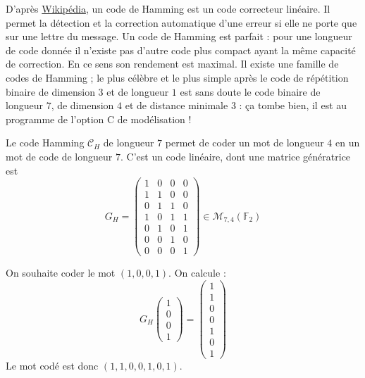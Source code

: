 	D'après \href{https://fr.wikipedia.org/wiki/Code_de_Hamming}{Wikipédia}, un code de Hamming est un code correcteur linéaire. Il permet la détection et la correction automatique d'une erreur si elle ne porte que sur une lettre du message. Un code de Hamming est parfait : pour une longueur de code donnée il n'existe pas d'autre code plus compact ayant la même capacité de correction. En ce sens son rendement est maximal. Il existe une famille de codes de Hamming ; le plus célèbre et le plus simple après le code de répétition binaire de dimension $3$ et de longueur $1$ est sans doute le code binaire de longueur $7$, de dimension $4$ et de distance minimale $3$ : ça tombe bien, il est au programme de l'option C de modélisation !
	
	\begin{definition}
		Le code Hamming $\mathcal{C}_H$ de longueur $7$ permet de coder un mot de longueur $4$ en un mot de code de longueur $7$. C'est un code linéaire, dont une matrice génératrice est
		\[ G_H = \begin{pmatrix}
			1 & 0 & 0 & 0 \\
			1 & 1 & 0 & 0 \\
			0 & 1 & 1 & 0 \\
			1 & 0 & 1 & 1 \\
			0 & 1 & 0 & 1 \\
			0 & 0 & 1 & 0 \\
			0 & 0 & 0 & 1
		\end{pmatrix} \in \mathcal{M}_{7,4}(\mathbb{F}_2) \] 
	\end{definition}
	
	\begin{example}
		On souhaite coder le mot $(1,0,0,1)$. On calcule :
		\[ G_H \begin{pmatrix} 1 \\ 0 \\ 0 \\ 1 \end{pmatrix}  = \begin{pmatrix} 1 \\ 1 \\ 0 \\ 0 \\ 1 \\ 0 \\ 1 \end{pmatrix} \]
		Le mot codé est donc $(1,1,0,0,1,0,1)$.
	\end{example}
	
